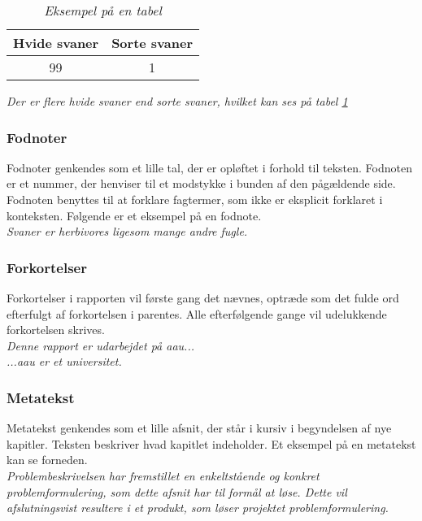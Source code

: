 \begin{table}[ht]
    \centering
    \begin{tabular}{ c c }
        \textbf{Hvide svaner} & \textbf{Sorte svaner} \\
        \midrule
        99 & 1 \\
    \end{tabular}
    \caption{\textit{Eksempel på en tabel}}
    \label{tab:abc}
\end{table}

\noindent \textit{Der er flere hvide svaner end sorte svaner, hvilket kan ses på tabel \ref{tab:abc}}

\subsubsection*{Fodnoter}
Fodnoter genkendes som et lille tal, der er opløftet i forhold til teksten. Fodnoten er et nummer, der henviser til et modstykke i bunden af den pågældende side. Fodnoten benyttes til at forklare fagtermer, som ikke er eksplicit forklaret i konteksten. Følgende er et eksempel på en fodnote.\\

\noindent \textit{Svaner er herbivores ligesom mange andre fugle.}

\subsubsection*{Forkortelser}
Forkortelser i rapporten vil første gang det nævnes, optræde som det fulde ord efterfulgt af forkortelsen i parentes. Alle efterfølgende gange vil udelukkende forkortelsen skrives. \\

\noindent \textit{Denne rapport er udarbejdet på \gls{aau}... \\
\noindent ...\gls{aau} er et universitet. }

\subsubsection*{Metatekst}
Metatekst genkendes som et lille afsnit, der står i kursiv i begyndelsen af nye kapitler. Teksten beskriver hvad kapitlet indeholder. Et eksempel på en metatekst kan se forneden.\\

\noindent \textit{Problembeskrivelsen har fremstillet en enkeltstående og konkret problemformulering, som dette afsnit har til formål at løse. Dette vil afslutningsvist resultere i et produkt, som løser projektet problemformulering.}

